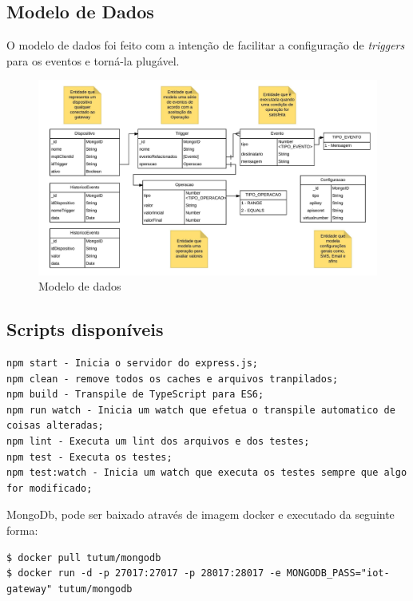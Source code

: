 \subsection{Modelo de Dados}

O modelo de dados foi feito com a intenção de facilitar a configuração de \textit{triggers} para os eventos e torná-la plugável. 

\begin{figure}[h!]
	\begin{center}
		\includegraphics[width=1\textwidth]{./img/modelo-de-dados}
		\caption{Modelo de dados}
		\label{fig:modeloDeDados}
	\end{center}
\end{figure}

\subsection{Scripts disponíveis}

\begin{verbatim}
npm start - Inicia o servidor do express.js;
npm clean - remove todos os caches e arquivos tranpilados;
npm build - Transpile de TypeScript para ES6;
npm run watch - Inicia um watch que efetua o transpile automatico de coisas alteradas;
npm lint - Executa um lint dos arquivos e dos testes;
npm test - Executa os testes;
npm test:watch - Inicia um watch que executa os testes sempre que algo for modificado;
\end{verbatim}

MongoDb, pode ser baixado através de imagem docker e executado da seguinte forma:
\begin{verbatim}
$ docker pull tutum/mongodb
$ docker run -d -p 27017:27017 -p 28017:28017 -e MONGODB_PASS="iot-gateway" tutum/mongodb
\end{verbatim}


